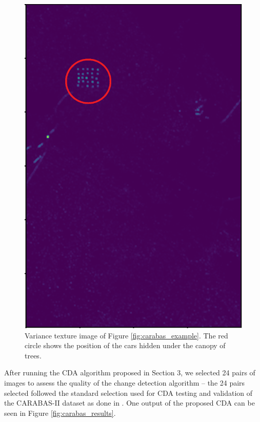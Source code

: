 \begin{figure}[H]
  \centering
  \includegraphics[width=0.8\linewidth]{Cap3-Results/variance_exemplo.png}
  \caption{Variance texture image of Figure \ref{fig:carabas_example}.
  The red circle shows the position of the cars hidden under the canopy of trees.}
  \label{fig:variance_example}
\end{figure}

After running the CDA algorithm proposed in Section 3, we selected 24 pairs of images to assess the quality of the change detection algorithm -- the 24 pairs selected followed the standard selection used for CDA testing and validation of the CARABAS-II dataset as done in \cite{Carabas, Ricardo, LucasRamos}. One output of the proposed CDA can be seen in Figure \ref{fig:carabas_results}.

